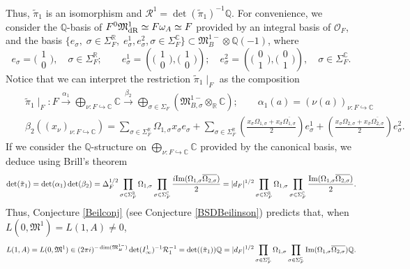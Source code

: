 \documentclass{amsart}
\theoremstyle{definition}
\theoremstyle{remark}
\numberwithin{equation}{section}
\newcommand{\mfM}{{\mathfrak M}}
\newcommand{\Q}{{\mathbb Q}}
\newcommand{\C}{{\mathbb C}}
\newcommand{\R}{{\mathbb R}}
\newcommand{\cR}{{\mathcal R}}
\newcommand{\cO}{{\mathcal O}}
\begin{document}
    Thus, $\tilde\pi_1$ is an isomorphism and $\cR^1=\det(\tilde\pi_1)^{-1}\Q$. For convenience, we consider the $\Q$-basis of $F^0\mfM^1_{\rm dR}\simeq F\omega_A\simeq F$ provided by an integral basis of $\cO_F$, and the basis $\{e_\sigma,\;\sigma\in\Sigma_F^\R,\;e_\sigma^1,e_\sigma^2,\sigma\in\Sigma_F^\C\}\subset\mfM_{B}^{1-}\otimes\Q(-1)$, where
    \[
    e_\sigma=\big(\begin{smallmatrix}1\\ 0\end{smallmatrix}\big),\quad\sigma\in\Sigma_F^\R;\qquad e_\sigma^1=\left(\big(\begin{smallmatrix}1\\ 0\end{smallmatrix}\big),\big(\begin{smallmatrix}1\\ 0\end{smallmatrix}\big)\right);\quad e_\sigma^2=\left(\big(\begin{smallmatrix}0\\ 1\end{smallmatrix}\big),\big(\begin{smallmatrix}0\\ 1\end{smallmatrix}\big)\right),\quad\sigma\in\Sigma_F^\C.
    \]
    Notice that we can interpret the restriction $\tilde\pi_1\mid_F$ as the composition
    \begin{eqnarray*}
    &&\tilde\pi_1\mid_F:F\stackrel{\alpha_1}{\longrightarrow}\bigoplus_{\nu:F\hookrightarrow\C}\C\stackrel{\beta_2}{\longrightarrow}\bigoplus_{\sigma\in\Sigma_F}(\mfM^{1-}_{B,\sigma}\otimes_\R\C);\qquad \alpha_1(a)=(\nu(a))_{\nu:F\hookrightarrow\C}\\
    &&\beta_2\left((x_\nu)_{\nu:F\hookrightarrow\C}\right)=\sum_{\sigma\in\Sigma_F^\R}\Omega_{1,\sigma}x_\sigma e_\sigma+\sum_{\sigma\in\Sigma_F^\R}\left(\frac{x_\sigma\Omega_{1,\sigma}+x_{\bar\sigma}\overline{\Omega_{1,\sigma}}}{2}\right)e_\sigma^1+\left(\frac{x_\sigma\Omega_{2,\sigma}+x_{\bar\sigma}\overline{\Omega_{2,\sigma}}}{2}\right)e_\sigma^2.
    \end{eqnarray*}
    If we consider the $\Q$-structure on $\bigoplus_{\nu:F\hookrightarrow\C}\C$ provided by the canonical basis, we deduce using Brill's theorem
    \[
\det(\tilde\pi_1)=\det(\alpha_1)\det(\beta_2)=\Delta_F^{1/2}\prod_{\sigma\in\Sigma_F^\R}\Omega_{1,\sigma}\prod_{\sigma\in\Sigma_F^\C}\frac{i{\rm Im}(\Omega_{1,\sigma}\overline{\Omega_{2,\sigma}})}{2}=|d_F|^{1/2}\prod_{\sigma\in\Sigma_F^\R}\Omega_{1,\sigma}\prod_{\sigma\in\Sigma_F^\C}\frac{{\rm Im}(\Omega_{1,\sigma}\overline{\Omega_{2,\sigma}})}{2}.
    \]
    Thus, Conjecture \ref{Beilconj} (see Conjecture \ref{BSDBeilinson}) predicts that, when $L(0,\mfM^1)=L(1,A)\neq0$,
    \begin{equation*}
    L(1,A)=L(0,\mfM^1)\in(2\pi i)^{-\dim(\mfM_B^{1-})}\det(I^1_\infty)^{-1}\cR_1^{-1}=\det((\tilde\pi_1))\Q=|d_F|^{1/2}\prod_{\sigma\in\Sigma_F^\R}\Omega_{1,\sigma}\prod_{\sigma\in\Sigma_F^\C}{\rm Im}(\Omega_{1,\sigma}\overline{\Omega_{2,\sigma}})\Q.
    \end{equation*}
    
\end{document}
